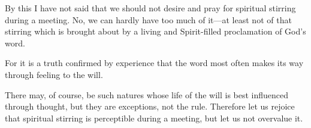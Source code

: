 By this I have not said that we should not desire and pray for spiritual stirring during a meeting. No, we can hardly have too much of it—at least not of that stirring which is brought about by a living and Spirit-filled proclamation of God’s word.

For it is a truth confirmed by experience that the word most often makes its way through feeling to the will.

There may, of course, be such natures whose life of the will is best influenced through thought, but they are exceptions, not the rule. Therefore let us rejoice that spiritual stirring is perceptible during a meeting, but let us not overvalue it.